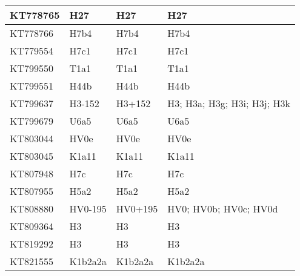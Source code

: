 \begin{footnotesize}
\begin{longtable}{|l|l|l|l|}
KT778765          & H27              & H27                  & H27                         \\ \hline
KT778766          & H7b4             & H7b4                 & H7b4                        \\ \hline
KT779554          & H7c1             & H7c1                 & H7c1                        \\ \hline
KT799550          & T1a1             & T1a1                 & T1a1                        \\ \hline
KT799551          & H44b             & H44b                 & H44b                        \\ \hline
KT799637          & H3-152           & H3+152               & H3; H3a; H3g; H3i; H3j; H3k \\ \hline
KT799679          & U6a5             & U6a5                 & U6a5                        \\ \hline
KT803044          & HV0e             & HV0e                 & HV0e                        \\ \hline
KT803045          & K1a11            & K1a11                & K1a11                       \\ \hline
KT807948          & H7c              & H7c                  & H7c                         \\ \hline
KT807955          & H5a2             & H5a2                 & H5a2                        \\ \hline
KT808880          & HV0-195          & HV0+195              & HV0; HV0b; HV0c; HV0d       \\ \hline
KT809364          & H3               & H3                   & H3                          \\ \hline
KT819292          & H3               & H3                   & H3                          \\ \hline
KT821555          & K1b2a2a          & K1b2a2a              & K1b2a2a                     \\ \hline
\end{longtable}
\end{footnotesize}